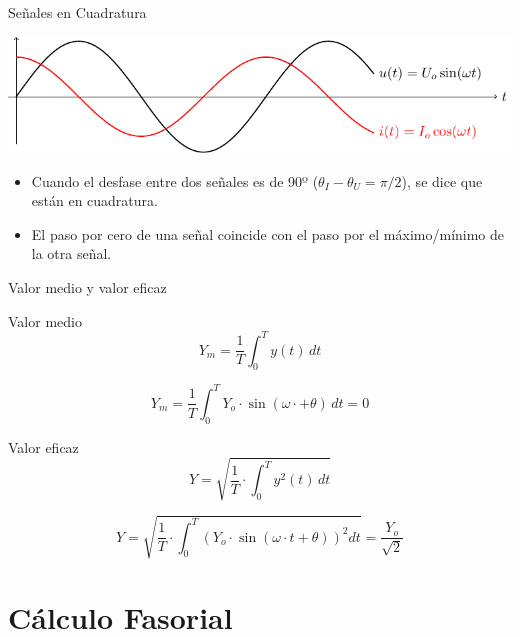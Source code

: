 \documentclass[xcolor={usenames,svgnames,dvipsnames}]{beamer}
\begin{document}
\begin{frame}[label={sec:org9b15dee}]{Señales en Cuadratura}
\begin{center}
\includegraphics[width=.9\linewidth]{figs/cuadratura.pdf}
\end{center}

\begin{itemize}
\item Cuando el desfase entre dos señales es de 90º (\(\theta_I - \theta_U = \pi/2\)), se dice que están en cuadratura.
\item El paso por cero de una señal coincide con el paso por el máximo/mínimo de la otra señal.
\end{itemize}
\end{frame}


\begin{frame}[label={sec:org1beb7c1}]{Valor medio y valor eficaz}
\begin{block}{Valor medio}
\[
Y_m=\frac{1}{T}\int_{0}^{T}y(t)\, dt
\]

\[
Y_m=\frac{1}{T}\int_{0}^{T}Y_{o}\cdot\sin(\omega\cdot+\theta)\, dt=0
\]
\end{block}
\begin{block}{Valor eficaz}
\[
Y = \sqrt{\frac{1}{T}\cdot\int_{0}^{T}y^{2}(t)\, dt}
\]

\[
Y=\sqrt{\frac{1}{T}\cdot\int_{0}^{T}\left(Y_{o}\cdot\sin(\omega\cdot t+\theta)\right)^{2}dt}=\boxed{\frac{Y_{o}}{\sqrt{2}}}
\]
\end{block}
\end{frame}
\section{Cálculo Fasorial}
\label{sec:org52817ab}
\end{document}
